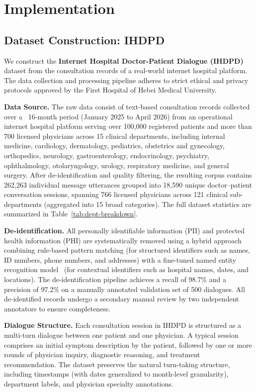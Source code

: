 ﻿\section*{Implementation}\label{section:implementation}

\subsection*{Dataset Construction: IHDPD}

We construct the \textbf{Internet Hospital Doctor-Patient Dialogue (IHDPD)} dataset from the consultation records of a real-world internet hospital platform. The data collection and processing pipeline adheres to strict ethical and privacy protocols approved by the First Hospital of Hebei Medical University.

\textbf{Data Source.} The raw data consist of text-based consultation records collected over a ~16-month period (January 2025 to April 2026) from an operational internet hospital platform serving over 100,000 registered patients and more than 700 licensed physicians across 15 clinical departments, including internal medicine, cardiology, dermatology, pediatrics, obstetrics and gynecology, orthopedics, neurology, gastroenterology, endocrinology, psychiatry, ophthalmology, otolaryngology, urology, respiratory medicine, and general surgery. After de-identification and quality filtering, the resulting corpus contains 262,263 individual message utterances grouped into 18,590 unique doctor--patient conversation sessions, spanning 766 licensed physicians across 121 clinical sub-departments (aggregated into 15 broad categories). The full dataset statistics are summarized in Table~\ref{tab:dept-breakdown}.

\textbf{De-identification.} All personally identifiable information (PII) and protected health information (PHI) are systematically removed using a hybrid approach combining rule-based pattern matching (for structured identifiers such as names, ID numbers, phone numbers, and addresses) with a fine-tuned named entity recognition model~\cite{johnsonMIMICIIIFreelyAccessible2016} (for contextual identifiers such as hospital names, dates, and locations). The de-identification pipeline achieves a recall of 98.7\% and a precision of 97.2\% on a manually annotated validation set of 500 dialogues. All de-identified records undergo a secondary manual review by two independent annotators to ensure completeness.

\textbf{Dialogue Structure.} Each consultation session in IHDPD is structured as a multi-turn dialogue between one patient and one physician. A typical session comprises an initial symptom description by the patient, followed by one or more rounds of physician inquiry, diagnostic reasoning, and treatment recommendation. The dataset preserves the natural turn-taking structure, including timestamps (with dates generalized to month-level granularity), department labels, and physician specialty annotations.

